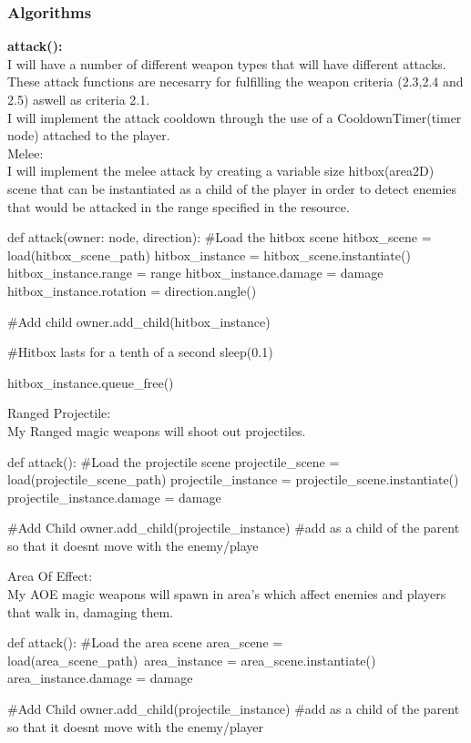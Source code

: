 \documentclass{article}
\begin{document}
        \subsubsection{Algorithms}
        \textbf{attack():}\\
        I will have a number of different weapon types that will have different attacks. These attack functions are necesarry for fulfilling the weapon criteria (2.3,2.4 and 2.5) aswell as criteria 2.1.\\
        I will implement the attack cooldown through the use of a CooldownTimer(timer node) attached to the player.\\
        Melee:\\
        I will implement the melee attack by creating a variable size hitbox(area2D) scene that can be instantiated as a child of the player in order to detect enemies that would be attacked in the range specified in the resource.\\
        \begin{python}
def attack(owner: node, direction):
   #Load the hitbox scene
   hitbox_scene = load(hitbox_scene_path)
   hitbox_instance = hitbox_scene.instantiate()
   hitbox_instance.range = range
   hitbox_instance.damage = damage
   hitbox_instance.rotation = direction.angle()

   #Add child
   owner.add_child(hitbox_instance)

   #Hitbox lasts for a tenth of a second
   sleep(0.1)
   
   hitbox_instance.queue_free()

        \end{python}
        Ranged Projectile:\\
        My Ranged magic weapons will shoot out projectiles.\\
        \begin{python}
def attack():
   #Load the projectile scene
   projectile_scene = load(projectile_scene_path)
   projectile_instance = projectile_scene.instantiate()
   projectile_instance.damage = damage

   #Add Child
   owner.add_child(projectile_instance) #add as a child of the parent so that it doesnt move with the enemy/playe
        \end{python}
        Area Of Effect:\\
        My AOE magic weapons will spawn in area's which affect enemies and players that walk in, damaging them.\\
        \begin{python}
def attack():
   #Load the area scene
   area_scene = load(area_scene_path)\
   area_instance = area_scene.instantiate()
   area_instance.damage = damage

   #Add Child
   owner.add_child(projectile_instance) #add as a child of the parent so that it doesnt move with the enemy/player
        \end{python}
\end{document}
